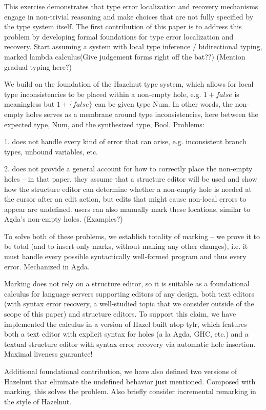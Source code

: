 This exercise demonstrates that type error localization and recovery mechanisms engage in non-trivial reasoning and make choices that are not fully specified by the type system itself. 
The first contribution of this paper is to address this problem by developing formal foundations for type error localization and recovery. 
Start assuming a system with local type inference / bidirectional typing, marked lambda calculus(Give judgement forms right off the bat??) 
(Mention gradual typing here?)

We build on the foundation of the Hazelnut type system, which allows for local type inconsistencies to be placed within a non-empty hole, 
e.g. $1 + false$ is meaningless but $1 + \{false\}$ can be given type Num. In other words, the non-empty holes serves as a membrane around type inconsistencies, here between the expected type, Num, and the synthesized type, Bool. Problems:

1. does not handle every kind of error that can arise, e.g. inconsistent branch types, unbound variables, etc.

2. does not provide a general account for how to correctly place the non-empty holes -- in that paper, they assume that a structure editor will be used and show how the structure editor can determine whether a non-empty hole is needed at the cursor after an edit action, but edits that might cause non-local errors to appear are undefined. users can also manually mark these locations, similar to Agda's non-empty holes. (Examples?)

To solve both of these problems, we establish totality of marking -- we prove it to be total (and to insert only marks, without making any other changes), i.e. it must handle 
every possible syntactically well-formed program and thus every error. Mechanized in Agda.

Marking does not rely on a structure editor, so it is suitable as a foundational calculus for language servers supporting editors of any 
design, both text editors (with syntax error recovery, a well-studied topic that we consider outside of the scope of this paper) and structure editors. To support this claim, we have implemented the calculus in a version of Hazel built atop tylr, which features both a text editor with explicit syntax for holes (a la Agda, GHC, etc.) and a textual structure editor with syntax error recovery via automatic hole insertion. Maximal liveness guarantee! 

Additional foundational contribution, we have also defined two versions of Hazelnut that eliminate the undefined behavior just mentioned. Composed with marking, this solves the problem. Also briefly consider incremental remarking in the style of Hazelnut.


